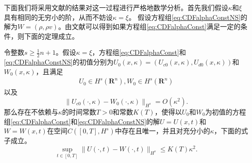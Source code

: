	下面我们将采用文献\cite{yang2015validity}的结果对这一过程进行严格地数学分析。首先我们假设$\kappa$和$\xi$具有相同的无穷小的阶，从而不妨设$\kappa = \xi$。
	假设方程组\eqref{eq:CDFalphaConstNS}的解为$W = (\rho,\rho v)$。由文献\cite{yang2015validity}可以得到如果方程组\eqref{eq:CDFalphaConst}满足一定的条件，则下面的定理成立。
	\begin{theorem} \label{th:chapmanenskog}
		令整数$s \ge \frac{1}{2}n+1$。假设$\kappa=\xi$，方程组\eqref{eq:CDFalphaConst}和\eqref{eq:CDFalphaConstNS}的初值分别为$U_0(x,\kappa) = (U_{c0}(x,\kappa),U_{d0}(x,\kappa))$和$W_0(x,\kappa)$，且满足
		\begin{eqnarray*}
			U_0 \in H^s(\mathbf{R}^n), W_0 \in H^s(\mathbf{R}^n)
		\end{eqnarray*}
		以及
		\begin{equation*}
			\|U_{c0}(\cdot,\kappa) - W_0(\cdot, \kappa) \|_{H^s} = O(\kappa^2).
		\end{equation*}
		那么存在不依赖与$\kappa$的时间常数$T>0$和常数$K(T)$，使得以$U_0$和$W_0$为初值的方程组\eqref{eq:CDFalphaConst}和\eqref{eq:CDFalphaConstNS}的解$U=U(x,t)$和$W=W(x,t)$在空间$C([0,T],H^s)$中存在且唯一，并且对充分小的$\kappa$，下面的式子成立。
		\begin{equation}
			\sup_{t \in [0,T]} \| U(\cdot,t) - W(\cdot,t) \|_{H^s} \le K(T) \kappa^2.
		\end{equation}
	\end{theorem}

